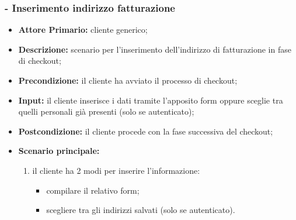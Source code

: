 \subsubsection{ - Inserimento indirizzo fatturazione}
\begin{itemize}
    \item \textbf{Attore Primario:} cliente generico;
    \item \textbf{Descrizione:} scenario per l'inserimento dell'indirizzo di fatturazione in fase di checkout;
    \item \textbf{Precondizione:} il cliente ha avviato il processo di checkout;
    \item \textbf{Input:} il cliente inserisce i dati tramite l'apposito form oppure sceglie tra quelli personali già presenti (solo se autenticato);
    \item \textbf{Postcondizione:} il cliente procede con la fase successiva del checkout;
    \item \textbf{Scenario principale:}
          \begin{enumerate}
              \item il cliente ha 2 modi per inserire l'informazione:
                    \begin{itemize}
                        \item compilare il relativo form;
                        \item scegliere tra gli indirizzi salvati (solo se autenticato).
                    \end{itemize}
          \end{enumerate}
\end{itemize}

\stepsubUserCase
